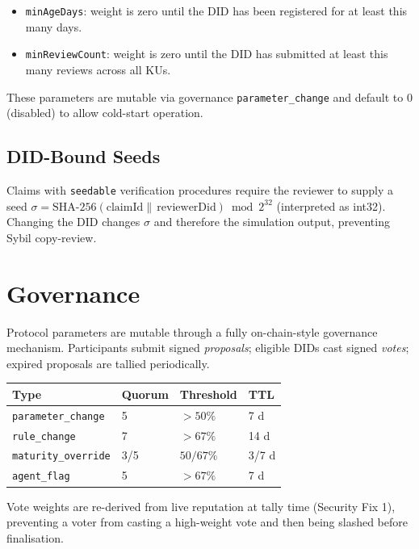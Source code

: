 \documentclass[10pt,twocolumn]{article}
\begin{document}
\begin{itemize}[noitemsep,topsep=2pt]
  \item \texttt{minAgeDays}: weight is zero until the DID has been registered
        for at least this many days.
  \item \texttt{minReviewCount}: weight is zero until the DID has submitted
        at least this many reviews across all KUs.
\end{itemize}

These parameters are mutable via governance \texttt{parameter\_change} and
default to 0 (disabled) to allow cold-start operation.

\subsection{DID-Bound Seeds}

Claims with \texttt{seedable} verification procedures require the reviewer to
supply a seed $\sigma = \text{SHA-256}(\text{claimId} \|\, \text{reviewerDid})
\bmod 2^{32}$ (interpreted as int32). Changing the DID changes $\sigma$ and
therefore the simulation output, preventing Sybil copy-review.

\section{Governance}

Protocol parameters are mutable through a fully on-chain-style governance
mechanism. Participants submit signed \emph{proposals}; eligible DIDs cast
signed \emph{votes}; expired proposals are tallied periodically.

\begin{center}
\small
\begin{tabular}{llll}
\toprule
\textbf{Type} & \textbf{Quorum} & \textbf{Threshold} & \textbf{TTL} \\
\midrule
\texttt{parameter\_change}  & 5 & $>50\%$ & 7 d \\
\texttt{rule\_change}       & 7 & $>67\%$ & 14 d \\
\texttt{maturity\_override} & 3/5 & $50/67\%$ & 3/7 d \\
\texttt{agent\_flag}        & 5 & $>67\%$ & 7 d \\
\bottomrule
\end{tabular}
\end{center}

\noindent Vote weights are re-derived from live reputation at tally time
(Security Fix 1), preventing a voter from casting a high-weight vote and
then being slashed before finalisation.
\end{document}
